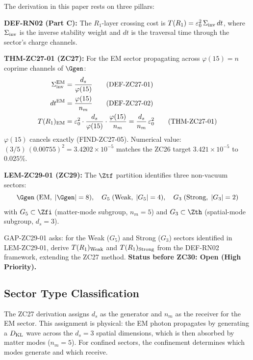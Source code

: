 \documentclass[12pt, a4paper]{article}
\begin{document}
\begin{formalbox}[title={Inherited Foundations}]
The derivation in this paper rests on three pillars:

\medskip
\textbf{DEF-RN02 (Part C):}
The $R_1$-layer crossing cost is
$T(R_1) = \varepsilon_0^2\,\Sigma_{\rm inv}\,dt$,
where $\Sigma_{\rm inv}$ is the inverse stability weight
and $dt$ is the traversal time through the sector's
charge channels.

\medskip
\textbf{THM-ZC27-01 (ZC27):}
For the EM sector propagating across $\varphi(15) = n$
coprime channels of $\Ggen$:
\begin{align}
  \Sigma_{\rm inv}^{\rm EM} &= \frac{d_s}{\varphi(15)}
    \tag{DEF-ZC27-01} \\
  dt^{\rm EM} &= \frac{\varphi(15)}{n_m}
    \tag{DEF-ZC27-02} \\
  T(R_1)_{\rm EM}
    &= \varepsilon_0^2 \cdot
       \frac{d_s}{\varphi(15)} \cdot \frac{\varphi(15)}{n_m}
     = \frac{d_s}{n_m}\,\varepsilon_0^2
    \tag{THM-ZC27-01}
\end{align}
$\varphi(15)$ cancels exactly (FIND-ZC27-05).
Numerical value: $(3/5)\,(0.00755)^2 = 3.4202 \times 10^{-5}$
matches the ZC26 target $3.421 \times 10^{-5}$ to $0.025\%$.

\medskip
\textbf{LEM-ZC29-01 (ZC29):}
The $\Ztf$ partition identifies three non-vacuum sectors:
\[
  \Ggen\;(\text{EM},\;|\Ggen|=8),\quad
  G_5\;(\text{Weak},\;|G_5|=4),\quad
  G_3\;(\text{Strong},\;|G_3|=2)
\]
with $G_5 \subset \Zfi$ (matter-mode subgroup, $n_m=5$)
and $G_3 \subset \Zth$ (spatial-mode subgroup, $d_s=3$).
\end{formalbox}

\begin{formalbox}[title={GAP-ZC29-01 Statement}]
GAP-ZC29-01 asks: for the Weak ($G_5$) and Strong ($G_3$)
sectors identified in LEM-ZC29-01, derive
$T(R_1)_{\rm Weak}$ and $T(R_1)_{\rm Strong}$
from the DEF-RN02 framework, extending the ZC27 method.
\textbf{Status before ZC30: Open (High Priority).}
\end{formalbox}

\subsection{Sector Type Classification}
\label{zc30:sec:types}

The ZC27 derivation assigns $d_s$ as the generator and $n_m$ as
the receiver for the EM sector.
This assignment is physical: the EM photon propagates by generating
a $D_{\rm KL}$ wave across the $d_s = 3$ spatial dimensions,
which is then absorbed by matter modes ($n_m = 5$).
For confined sectors, the confinement determines which modes
generate and which receive.
\end{document}
